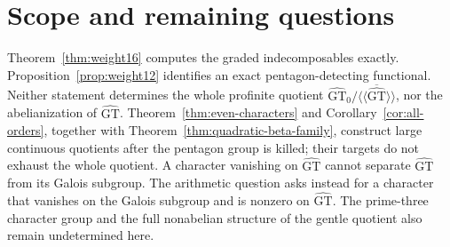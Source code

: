 \documentclass[11pt]{article}
\newcommand{\GT}{\widehat{\mathrm{GT}}}
\newcommand{\GTz}{\widehat{\mathrm{GT}}_0}
\theoremstyle{definition}
\theoremstyle{remark}
\begin{document}




\section{Scope and remaining questions}
Theorem~\ref{thm:weight16} computes the graded indecomposables exactly.
Proposition~\ref{prop:weight12} identifies an exact pentagon-detecting
functional.  Neither statement determines the whole profinite quotient
$\GTz/\overline{\langle\!\langle\GT\rangle\!\rangle}$, nor the
abelianization of $\GT$.  Theorem~\ref{thm:even-characters} and
Corollary~\ref{cor:all-orders}, together with
Theorem~\ref{thm:quadratic-beta-family}, construct large continuous quotients after
the pentagon group is killed; their targets do not exhaust the whole
quotient.  A character vanishing on $\GT$ cannot separate
$\GT$ from its Galois subgroup.  The arithmetic question asks instead
for a character that vanishes on the Galois subgroup and is nonzero
on $\GT$.
The prime-three character group and the full nonabelian structure of
the gentle quotient also remain undetermined here.
\end{document}
